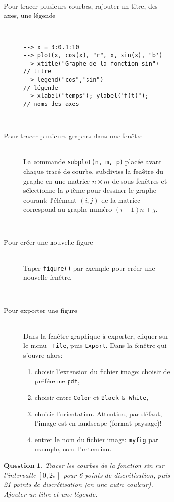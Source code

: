 \documentclass[a4paper,11pt]{article}
\newtheorem{question}{Question}
\begin{document}
\begin{figure}
\begin{figure}
\begin{description}
  ~
\item[Pour tracer plusieurs courbes, rajouter un titre, des axes, une
  légende] ~
\begin{verbatim}
--> x = 0:0.1:10
--> plot(x, cos(x), "r", x, sin(x), "b")
--> xtitle("Graphe de la fonction sin")  // titre
--> legend("cos","sin")                  // légende
--> xlabel("temps"); ylabel("f(t)");     // noms des axes
\end{verbatim}

  ~
\item[Pour tracer plusieurs graphes dans une fenêtre] ~\\
  La commande {\tt subplot(n, m, p)} placée avant chaque tracé de
  courbe, subdivise la fenêtre du graphe en une matrice $n\times m$ de
  sous-fenêtres et sélectionne la $p$-ième pour dessiner le graphe
  courant: l'élément $(i, j)$ de la matrice correspond au graphe numéro
  $(i-1)n + j$.

  ~
\item[Pour créer une nouvelle figure] ~\\
  Taper {\tt figure()} par exemple pour créer une nouvelle fenêtre.

  ~
\item[Pour exporter une figure] ~\\
  Dans la fenêtre graphique à exporter, cliquer sur le menu {\tt
    File}, puis {\tt Export}. Dans la fenêtre qui s'ouvre alors:
  \begin{enumerate}
  \item choisir l'extension du fichier image: choisir de préférence {\tt pdf},
  \item choisir entre {\tt Color} et {\tt Black \& White},
  \item choisir l'orientation. Attention, par défaut, l'image est en
    landscape (format paysage)!
  \item entrer le nom du fichier image: {\tt myfig} par exemple, sans
    l'extension.
  \end{enumerate}
\end{description}

\newpage

\begin{question} 
  Tracer les courbes de la fonction {\it sin} sur l'intervalle
  $[0,2\pi]$ pour 6 points de discrétisation, puis 21 points de
  discrétisation (en une autre couleur). Ajouter un titre et une légende.
\end{question}



\end{figure}
\end{figure}
\end{document}
